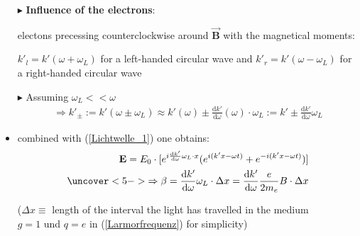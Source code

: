 \documentclass[10pt,a4paper]{beamer}
\begin{document}
\begin{frame}
\begin{itemize}
\item[$\blacktriangleright$] \textbf{Influence of the electrons}:\newline\pause
\begin{small}\noindent electons precessing counterclockwise around $\vec{\textbf{B}}$ with the magnetical moments: 
\end{small}\newline
$k'_l = k'(\omega + \omega_L)$ for a left-handed circular wave and \newline
$k'_r = k'(\omega - \omega_L)$ for a right-handed circular wave\newline\pause
\item[$\blacktriangleright$] Assuming $\omega_L << \omega$
\begin{align*}
\Rightarrow k'_{\pm} := k'(\omega \pm \omega_L) \approx k'(\omega) \pm \frac{\text{d} k'}{\text{d} \omega}(\omega)\cdot\omega_L := k' \pm \frac{\text{d}k'}{\text{d}\omega}\omega_L
\end{align*}\pause
\item combined with (\ref{Lichtwelle_1}) one obtains:
\begin{align*}
\textbf{E} = E_0\cdot[e^{i\frac{\text{d} k'}{\text{d} \omega}\omega_L \cdot x}(e^{i(k' x - \omega t)}+e^{-i(k' x - \omega t)})]\\
\uncover<5->{\Rightarrow \beta = \frac{\text{d} k'}{\text{d} \omega}\omega_L\cdot \Delta x = \frac{\text{d} k'}{\text{d} \omega}\frac{e}{2m_e}B\cdot \Delta x}
\end{align*}\pause
\begin{small}($\Delta x \equiv$ length of the interval the light has travelled in the medium\\
 $g = 1$ und $ q = e $ in (\ref{Larmorfrequenz}) for simplicity)
\end{small}
\end{itemize}
\end{frame}
\end{document}

